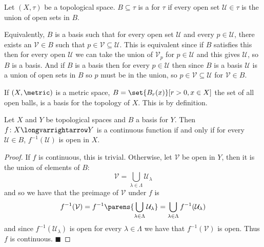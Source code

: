 \documentclass[10pt]{article}
\def\qed{\hskip1cm\penalty-100\hbox{}\hfill$\blacksquare$}
\def\mU{\mathcal{U}}
\def\mV{\mathcal{V}}
\def\longto{\longvarrightarrow}
\begin{document}


\bigskip

\begin{defn*}

    Let $(X,\tau)$ be a topological space.
    $B\subseteq\tau$ is a  for $\tau$ if every open set $\mU\in\tau$ is the union of open sets in $B$.

\end{defn*}

Equivalently, $B$ is a basis such that for every open set $\mU$ and every $p\in\mU$, there exists an $\mV\in B$ such that $p\in\mV\subseteq\mU$.
This is equivalent since if $B$ satisfies this then for every open $\mU$ we can take the union of $\mV_p$ for $p\in\mU$ and this gives $\mU$, so $B$ is a basis.
And if $B$ is a basis then for every $p\in\mU$ then since $B$ is a basis $\mU$ is a union of open sets in $B$ so $p$ must be in the union, so $p\in\mV\subseteq\mU$ for $\mV\in B$.

\begin{exam*}

    If $(X,\metric)$ is a metric space, $B=\set{B_r(x)}[r>0, x\in X]$ the set of all open balls, is a basis for the topology of $X$.
    This is by definition.

\end{exam*}

\begin{prop*}

    Let $X$ and $Y$ be topological spaces and $B$ a basis for $Y$.
    Then $f\colon X\longto Y$ is a continuous function if and only if for every $\mU\in B$, $f^{-1}(\mU)$ is open in $X$.

\end{prop*}

\begin{proof}

    If $f$ is continuous, this is trivial.
    Otherwise, let $\mV$ be open in $Y$, then it is the union of elements of $B$:
    \[ \mV = \bigcup_{\lambda\in\Lambda}\mU_\lambda \]
    and so we have that the preimage of $\mV$ under $f$ is
    \[ f^{-1}(\mV) = f^{-1}\parens{\bigcup_{\lambda\in\Lambda}\mU_\lambda} = \bigcup_{\lambda\in\Lambda}f^{-1}(\mU_\lambda) \]
    and since $f^{-1}(\mU_\lambda)$ is open for every $\lambda\in\Lambda$ we have that $f^{-1}(\mV)$ is open.
    Thus $f$ is continuous.
    \qed

\end{proof}
\end{document}

